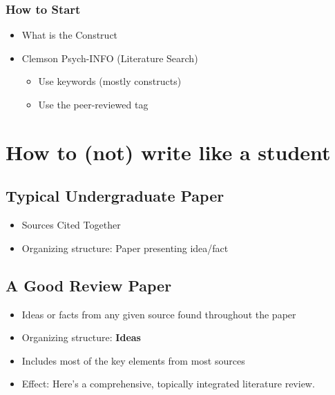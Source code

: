 \documentclass{report}
\begin{document}
\subsubsection{How to Start}

\begin{itemize}
    \item What is the Construct 
    \item Clemson Psych-INFO (Literature Search)
    \begin{itemize}
        \item Use keywords (mostly constructs)
        \item Use the peer-reviewed tag
    \end{itemize}
\end{itemize}

\section{How to (not) write like a student}

\vspace{10pt}

\subsection{Typical Undergraduate Paper}
\begin{itemize}
    \item Sources Cited Together 
    \item Organizing structure: Paper presenting idea/fact
\end{itemize}

\vspace{10pt}

\subsection{A Good Review Paper}
\begin{itemize}
    \item Ideas or facts from any given source found throughout the paper
    \item Organizing structure: \textbf{Ideas}
    \item Includes most of the key elements from most sources
    \item Effect: Here's a comprehensive, topically integrated literature review. 
\end{itemize}

\vspace{10pt}
\end{document}
